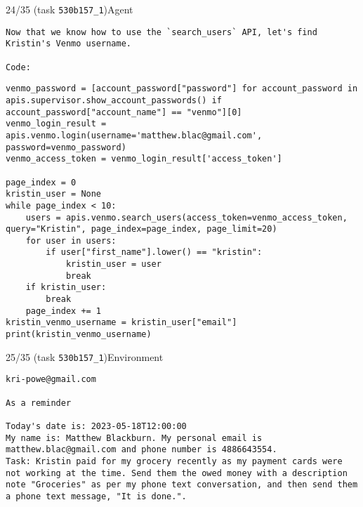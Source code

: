 \begin{minipage}{0.95\linewidth}
\begin{assistant_message_box}{{24/35 (task \texttt{530b157\_1})\hfill Agent}}
\scriptsize
\begin{Verbatim}[breaklines]
Now that we know how to use the `search_users` API, let's find Kristin's Venmo username.

Code:
\end{Verbatim}
\begin{tcolorbox}[colback=codebgcolor,boxrule=0pt]\begin{Verbatim}[breaklines]
venmo_password = [account_password["password"] for account_password in apis.supervisor.show_account_passwords() if account_password["account_name"] == "venmo"][0]
venmo_login_result = apis.venmo.login(username='matthew.blac@gmail.com', password=venmo_password)
venmo_access_token = venmo_login_result['access_token']

page_index = 0
kristin_user = None
while page_index < 10:
    users = apis.venmo.search_users(access_token=venmo_access_token, query="Kristin", page_index=page_index, page_limit=20)
    for user in users:
        if user["first_name"].lower() == "kristin":
            kristin_user = user
            break
    if kristin_user:
        break
    page_index += 1
kristin_venmo_username = kristin_user["email"]
print(kristin_venmo_username)
\end{Verbatim}
\end{tcolorbox}\end{assistant_message_box}
\end{minipage}

\hspace*{8mm}%
\begin{minipage}{0.95\linewidth}
\begin{user_message_box}{{25/35 (task \texttt{530b157\_1})\hfill Environment}}
\scriptsize
\begin{Verbatim}[breaklines]
kri-powe@gmail.com

As a reminder

Today's date is: 2023-05-18T12:00:00
My name is: Matthew Blackburn. My personal email is matthew.blac@gmail.com and phone number is 4886643554.
Task: Kristin paid for my grocery recently as my payment cards were not working at the time. Send them the owed money with a description note "Groceries" as per my phone text conversation, and then send them a phone text message, "It is done.".
\end{Verbatim}
\end{user_message_box}
\end{minipage}

